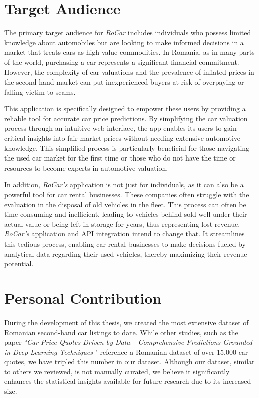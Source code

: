 \section{Target Audience}

The primary target audience for \textit{RoCar} includes individuals who possess limited knowledge about automobiles but are looking to make informed decisions in a market that treats cars as high-value commodities. In Romania, as in many parts of the world, purchasing a car represents a significant financial commitment. However, the complexity of car valuations and the prevalence of inflated prices in the second-hand market can put inexperienced buyers at risk of overpaying or falling victim to scams.

This application is specifically designed to empower these users by providing a reliable tool for accurate car price predictions. By simplifying the car valuation process through an intuitive web interface, the app enables its users to gain critical insights into fair market prices without needing extensive automotive knowledge. This simplified process is particularly beneficial for those navigating the used car market for the first time or those who do not have the time or resources to become experts in automotive valuation.

In addition, \textit{RoCar's} application is not just for individuals, as it can also be a powerful tool for car rental businesses. These companies often struggle with the evaluation in the disposal of old vehicles in the fleet. This process can often be time-consuming and inefficient, leading to vehicles behind sold well under their actual value or being left in storage for years, thus representing lost revenue. \textit{RoCar's} application and API integration intend to change that. It streamlines this tedious process, enabling car rental businesses to make decisions fueled by analytical data regarding their used vehicles, thereby maximizing their revenue potential.

\section{Personal Contribution}

During the development of this thesis, we created the most extensive dataset of Romanian second-hand car listings to date. While other studies, such as the paper \textit{"Car Price Quotes Driven by Data - Comprehensive Predictions Grounded in Deep Learning Techniques} " \cite{dutulescu2023car} reference a Romanian dataset of over 15,000 car quotes, we have tripled this number in our dataset. Although our dataset, similar to others we reviewed, is not manually curated, we believe it significantly enhances the statistical insights available for future research due to its increased size.

